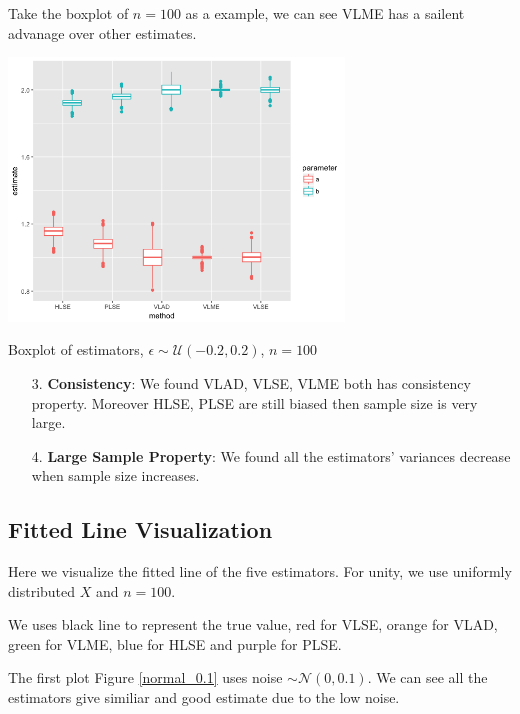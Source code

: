 \documentclass[twoside]{article}
\begin{document}
Take the boxplot of $n=100$ as a example, we can see VLME has a sailent advanage over other estimates.

\begin{center}
\makeatletter
\def\@captype{figure}
\makeatother
\includegraphics [height=7cm]{code/n=100,fixed,uniform.png}
\caption{Boxplot of estimators, $\epsilon \sim \mathcal{U}(-0.2,0.2)$, $n=100$}
\label{100-fixed-uniform}
\end{center}

\begin{itemize}
  \item [3.] \textbf{Consistency}: We found VLAD, VLSE, VLME both has consistency property. Moreover HLSE, PLSE are still biased then sample size is very large.
  \item [4.] \textbf{Large Sample Property}: We found all the estimators' variances decrease when sample size increases.
\end{itemize}

\subsection{Fitted Line Visualization}

Here we visualize the fitted line of the five estimators. For unity, we use uniformly distributed $X$ and $n=100$.

We uses black line to represent the true value, red for VLSE, orange for VLAD, green for VLME, blue for HLSE and purple for PLSE.

The first plot  Figure \ref{normal_0.1} uses noise $\sim \mathcal{N}(0,0.1)$. We can see all the estimators give similiar and good estimate due to the low noise.
\end{document}
